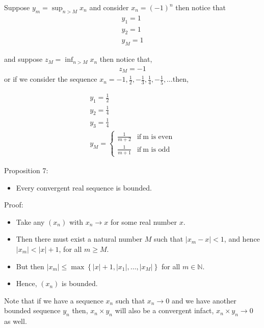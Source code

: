 \documentclass[12pt,a4paper]{article}
\begin{document}
Suppose \(y_{m}= \sup_{n>M} x_{n}\) and consider \(x_{n}={(-1)}^n\) then notice that
 \begin{align*}
    y_{1}=1\\
    y_{2}=1\\
    y_{M}=1
\end{align*}

and suppose \(z_{M}= \inf_{n>M} x_{n}\) then notice that,
 \begin{align*}
    z_{M}=-1
\end{align*}  
or if we consider the sequence \(x_{n}= -1, \frac{1}{2}, -\frac{1}{3}, \frac{1}{4}, -\frac{1}{5},\ldots \)then,

 \begin{align*}
    y_{1}=\frac{1}{2}\\
    y_{2}=\frac{1}{4}\\
    y_{3}=\frac{1}{4}\\
    y_{M}= \begin{cases} \frac{1}{m+2} & \text{if} \ \text{m is even}\\
        \frac{1}{m+1} & \text{if} \ \text{m is odd}
    \end{cases}
\end{align*}

Proposition 7:
\begin{itemize}
    \item  Every convergent real sequence is bounded.
\end{itemize}
Proof:
\begin{itemize}
    \item   Take any \(\left(x_n\right)\) with \(x_n \rightarrow x\) for some real number \(x\).
    \item Then there must exist a natural number \(M\) such that \(\left|x_m-x\right|<1\), and hence \(\left|x_m\right|<|x|+1\), for all \(m \geq M\).
    \item But then \(\left|x_m\right| \leq \max \left\{|x|+1,\left|x_1\right|, \ldots,\left|x_M\right|\right\}\) for all \(m \in \mathbb{N}\).
    \item Hence, \(\left(x_n\right)\) is bounded.
\end{itemize}

Note that if we have a sequence \(x_{n}\) such that \(x_{n} \to 0 \) and we have another bounded sequence \(y_{n}\) then, \(x_{n} \times y_{n} \) will also be a convergent infact, \(x_{n} \times y_{n} \to 0 \) as well.
\end{document}
